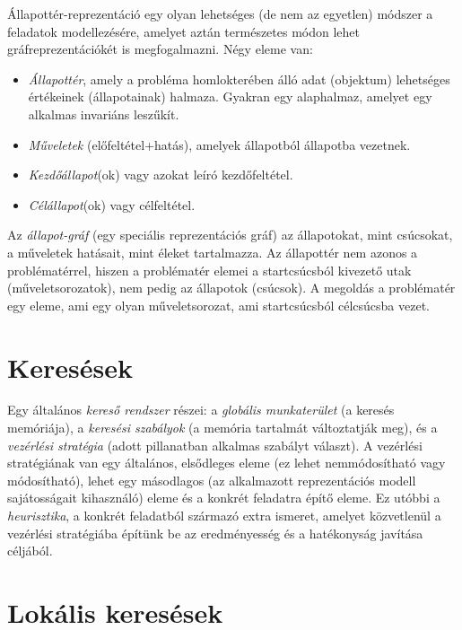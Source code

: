 \documentclass[margin=0px]{article}
\begin{document}
	Állapottér-reprezentáció egy olyan lehetséges (de nem az egyetlen) módszer a feladatok modellezésére, amelyet aztán természetes módon lehet gráfreprezentációkét is megfogalmazni. Négy eleme van:
	\begin{itemize}
		\item \textit{Állapottér}, amely a probléma homlokterében álló adat (objektum) lehetséges értékeinek (állapotainak) halmaza. Gyakran egy alaphalmaz, amelyet egy alkalmas invariáns leszűkít.
		\item \textit{Műveletek} (előfeltétel+hatás), amelyek állapotból állapotba vezetnek.
		\item \textit{Kezdőállapot}(ok) vagy azokat leíró kezdőfeltétel.
		\item \textit{Célállapot}(ok) vagy célfeltétel.
	\end{itemize}
	Az \textit{állapot-gráf} (egy speciális reprezentációs gráf) az állapotokat, mint csúcsokat, a műveletek hatásait, mint éleket tartalmazza.
	Az állapottér nem azonos a problématérrel, hiszen a problématér elemei a startcsúcsból kivezető utak (műveletsorozatok), nem pedig az állapotok (csúcsok). A megoldás a problématér egy eleme, ami egy olyan műveletsorozat, ami startcsúcsból célcsúcsba vezet.
	
	\section{Keresések}
	
	Egy általános \textit{kereső rendszer} részei: a \textit{globális munkaterület} (a keresés memóriája), a \textit{keresési szabályok} (a memória tartalmát változtatják meg), és a \textit{vezérlési stratégia} (adott pillanatban alkalmas szabályt választ). A vezérlési stratégiának van egy általános, elsődleges eleme (ez lehet nemmódosítható vagy módosítható), lehet egy másodlagos (az alkalmazott reprezentációs modell sajátosságait kihasználó) eleme és a konkrét feladatra építő eleme. Ez utóbbi a \textit{heurisztika}, a konkrét feladatból származó extra ismeret, amelyet közvetlenül a vezérlési stratégiába építünk be az eredményesség és a hatékonyság javítása céljából.
	
	\section{Lokális keresések}
	
\end{document}
